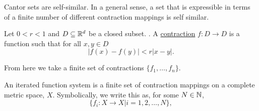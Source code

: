 





Cantor sets are self-similar.  In a general sense, a set that is expressible in terms of a finite number of different contraction mappings is self similar.  

\begin{definition}
    Let $0< r <1$ and $D \subseteq \mathbb{R}^d$ be a closed subset.  .  A \underline{contraction} $f: D \to D$ is a function such that for all $x,y \in D$ $$\vert f(x) - f(y) \vert < r\vert x - y \vert.$$ 
\end{definition}

From here we take a finite set of contractions $\{f_1, \dots, f_n\}.$    

\begin{definition}
    An iterated function system is a finite set of contraction mappings on a complete metric space, $X$.  Symbolically, we write this as, for some $N \in \mathbb{N}$,
    $$\{f_i:X \to X \vert i = 1,2,\dots, N\}, $$
\end{definition}


